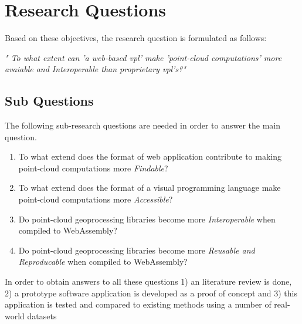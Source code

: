 \newpage
\section{Research Questions}
Based on these objectives, the research question is formulated as follows: 

\textit{"
To what extent can 'a web-based vpl' make 'point-cloud computations' more avaiable and Interoperable than proprietary vpl's?"}

\subsection*{Sub Questions}
The following sub-research questions are needed in order to answer the main question. 

\begin{enumerate}[a]
  \item To what extend does the format of web application contribute to making point-cloud computations more \emph{Findable}?  
  \item To what extend does the format of a visual programming language make point-cloud computations more \emph{Accessible}?  
  \item Do point-cloud geoprocessing libraries become more \emph{Interoperable} when compiled to WebAssembly?  
  \item Do point-cloud geoprocessing libraries become more \emph{Reusable and Reproducable} when compiled to WebAssembly?  
\end{enumerate}

In order to obtain answers to all these questions 
1) an literature review is done, 
2) a prototype software application is developed as a proof of concept and 
3) this application is tested and compared to existing methods using a number of real-world datasets





